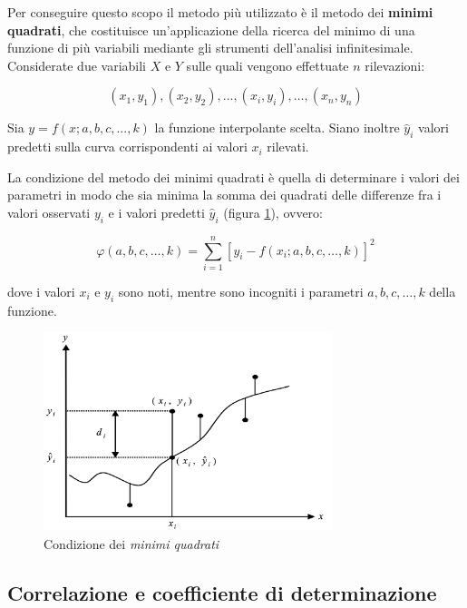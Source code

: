 Per conseguire questo scopo il metodo più utilizzato è il metodo dei \textbf{minimi quadrati}, che costituisce un’applicazione della ricerca del minimo di una funzione di più variabili mediante gli strumenti dell’analisi infinitesimale.\\

Considerate due variabili $X$ e $Y$ sulle quali vengono effettuate $n$ rilevazioni: 

$$\left(x_{1}, y_{1}\right),\left(x_{2}, y_{2}\right), \ldots,\left(x_{i}, y_{i}\right), \ldots,\left(x_{n}, y_{n}\right)$$\smallskip

Sia $y=f(x; a, b, c, ..., k)$ la funzione interpolante scelta. Siano inoltre $\hat{y}_{i}$ valori predetti sulla curva corrispondenti ai valori $x_i$ rilevati.

La condizione del metodo dei minimi quadrati è quella di determinare i valori dei parametri in modo che sia minima la somma dei quadrati delle differenze fra i valori osservati $y_i$ e i valori predetti $\hat{y}_i$ (figura \ref{fig:minimi_quadrati}), ovvero:

$$\varphi(a, b, c, \ldots, k)=\sum_{i=1}^{n}\left[y_{i}-f\left(x_{i} ; a, b, c, \ldots, k\right)\right]^{2}$$\smallskip

dove i valori $x_i$ e $y_i$ sono noti, mentre sono incogniti i parametri $a , b , c , … , k$ della funzione. \cite{excel_per_statistica_belluco}

\begin{figure}[H]
\centering
\includegraphics[width=0.75\textwidth,height=\textheight,keepaspectratio]{img/minimi_quadrati.png}
\caption{Condizione dei \textit{minimi quadrati} \cite{excel_per_statistica_belluco}}
\label{fig:minimi_quadrati}
\end{figure}

\subsection{Correlazione e coefficiente di determinazione}\label{ssec:regressione-correlazione}

